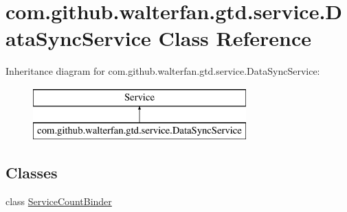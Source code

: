 \hypertarget{classcom_1_1github_1_1walterfan_1_1gtd_1_1service_1_1DataSyncService}{\section{com.\-github.\-walterfan.\-gtd.\-service.\-Data\-Sync\-Service Class Reference}
\label{classcom_1_1github_1_1walterfan_1_1gtd_1_1service_1_1DataSyncService}
}
Inheritance diagram for com.\-github.\-walterfan.\-gtd.\-service.\-Data\-Sync\-Service\-:\begin{figure}[H]
\begin{center}
\leavevmode
\includegraphics[height=2.000000cm]{classcom_1_1github_1_1walterfan_1_1gtd_1_1service_1_1DataSyncService}
\end{center}
\end{figure}
\subsection*{Classes}
\begin{DoxyCompactItemize}
\item 
class \hyperlink{classcom_1_1github_1_1walterfan_1_1gtd_1_1service_1_1DataSyncService_1_1ServiceCountBinder}{Service\-Count\-Binder}
\end{DoxyCompactItemize}
